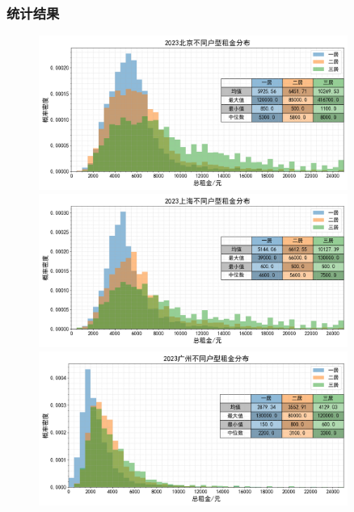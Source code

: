 \documentclass[lang=cn,11pt,a4paper]{elegantpaper}
\begin{document}
\subsubsection{统计结果}

\begin{figure}[H]
    \centering
    \includegraphics[width=0.9\textwidth]{image/2023北京不同户型租金分布.png}
    \includegraphics[width=0.9\textwidth]{image/2023上海不同户型租金分布.png}
    \includegraphics[width=0.9\textwidth]{image/2023广州不同户型租金分布.png}

\end{figure}
\end{document}
